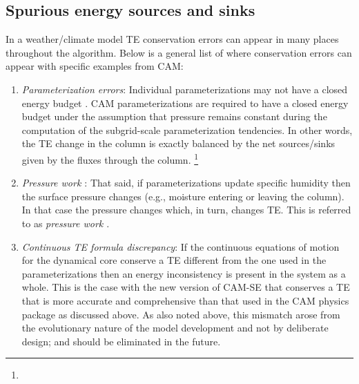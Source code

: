 \documentclass[draft,linenumbers]{agujournal}
\begin{document}
\subsection{Spurious energy sources and sinks}\label{subsec:spuriousE}
In a weather/climate model TE conservation errors can appear in many places throughout the algorithm. Below is a general list of where conservation errors can appear with specific examples from CAM:
\begin{enumerate}
\item {\em{Parameterization errors}}: Individual parameterizations may not have a closed energy budget {\color{red}{; for example, they may not have been designed to conserve TE as defined in the model or they may conserve a TE defined differently}}. CAM parameterizations are required to have a closed energy budget {\color{red}{(based on the discrete TE definition in CAM)}} under the assumption that pressure remains constant during the computation of the subgrid-scale parameterization tendencies. In other words, the TE change in the column is exactly balanced by the net sources/sinks given by the fluxes through the column. {\footnote{{\color{red}{If not, a fixer needs to ba applied since the CAM global fixer as implemented does not include any errors from the parameterizations. For example, in CAM parameterizations occasionally produce negative water vapor. Tese are filled without compensation and therefore affect the TE.}} }}
\item {\em{Pressure work {\color{red}{error}}}}: That said, if parameterizations update specific humidity then the surface pressure changes (e.g., moisture entering or leaving the column). In that case the pressure changes which, in turn, changes TE. This is referred to as {\em{pressure work {\color{red}{error}}}} \citep[section 3.1.8 in ][]{CAM5}.
\item {\em{Continuous TE formula discrepancy}}:  If the continuous equations of motion for the dynamical core conserve a TE different from the one used in the parameterizations then an energy inconsistency is present in the system as a whole. This is the case with the new version of CAM-SE that conserves a TE that is more accurate and comprehensive than that used in the CAM physics package as discussed above. As also noted above, this mismatch arose from the evolutionary nature of the model development and not by deliberate design; and should be eliminated in the future.

\end{enumerate}
\end{document}

